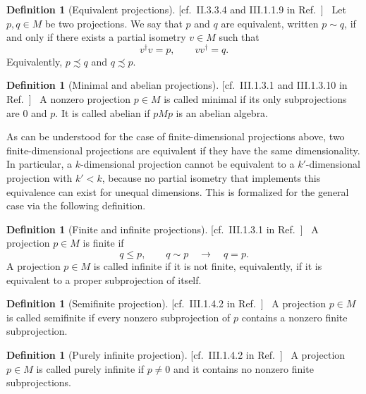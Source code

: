 \documentclass[aps,pra,reprint,superscriptaddress]{revtex4-2}
\newcommand{\thmref}[1]{\textnormal{[#1]}\ }
\theoremstyle{definition}
\newtheorem{definition}[theorem]{Definition}
\theoremstyle{remark}
\begin{document}
\begin{definition}[Equivalent projections]
\thmref{cf.~II.3.3.4 and III.1.1.9 in Ref.~\cite{Blackadar}}
Let $p,q\in M$ be two projections. We say that $p$ and $q$ are equivalent,
written $p\sim q$, if and only if there exists a partial isometry $v\in M$ such
that
\begin{equation}
    v^\dagger v=p,
    \qquad
    vv^\dagger=q.
\end{equation}
Equivalently, $p\precsim q$ and $q\precsim p$.
\end{definition}

\begin{definition}[Minimal and abelian projections]
\thmref{cf.~III.1.3.1 and III.1.3.10 in Ref.~\cite{Blackadar}}
A nonzero projection $p\in M$ is called minimal if its only subprojections are
$0$ and $p$. It is called abelian if $pMp$ is an abelian algebra.
\end{definition}

As can be understood for the case of finite-dimensional projections above, two
finite-dimensional projections are equivalent if they have the same
dimensionality. In particular, a $k$-dimensional projection cannot be
equivalent to a $k'$-dimensional projection with $k'<k$, because no partial
isometry that implements this equivalence can exist for unequal dimensions.
This is formalized for the general case via the following definition.

\begin{definition}[Finite and infinite projections]
\thmref{cf.~III.1.3.1 in Ref.~\cite{Blackadar}}
A projection $p\in M$ is finite if
\begin{equation}
    q\leq p,
    \qquad
    q\sim p
    \quad\to\quad
    q=p.
\end{equation}
    A projection $p\in M$ is called infinite if it is not finite, equivalently, if it is equivalent to
a proper subprojection of itself.
\end{definition}

\begin{definition}[Semifinite projection]
\thmref{cf.~III.1.4.2 in Ref.~\cite{Blackadar}}
A projection $p\in M$ is called semifinite if every nonzero subprojection of
$p$ contains a nonzero finite subprojection.
\end{definition}

\begin{definition}[Purely infinite projection]
\thmref{cf.~III.1.4.2 in Ref.~\cite{Blackadar}}
A projection $p\in M$ is called purely infinite if $p\neq0$ and it contains no
nonzero finite subprojections.
\end{definition}
\end{document}
